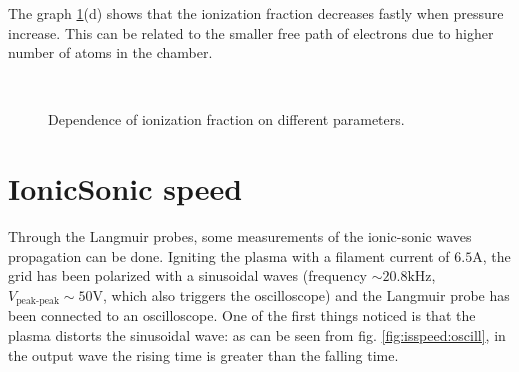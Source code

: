 \documentclass[11pt,a4 paper]{article}
\begin{document}
The graph \ref{fig:f}(d) shows that the ionization fraction decreases fastly when pressure increase. This can be related to the smaller free path of electrons due to higher number of atoms in the chamber.
%
\begin{figure}[H]
\\%
 \caption{Dependence of ionization fraction on different parameters.}\label{fig:f}%
\end{figure}

\section{IonicSonic speed}
Through the Langmuir probes, some measurements of the ionic-sonic waves propagation can be done. Igniting the plasma with a filament current of $6.5\si{\ampere}$, the grid has been polarized with a sinusoidal waves (frequency $\sim20.8\si{\kilo\hertz}$, $V_\text{peak-peak}\sim50\si{\volt}$, which also triggers the oscilloscope) and the Langmuir probe has been connected to an oscilloscope. One of the first things noticed is that the plasma distorts the sinusoidal wave: as can be seen from fig. \ref{fig:isspeed:oscill}, in the output wave the rising time is greater than the falling time.
\end{document}
